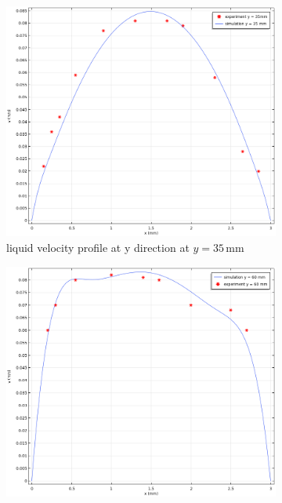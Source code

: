 \begin{figure}[H]
\centering
\begin{subfigure}{0.5\textwidth}
  \centering
  \includegraphics[width=1\linewidth]{squarechannelvalidation.png}
  \caption{liquid velocity profile at y direction at $ y = 35 \, \mathrm{mm} $}
  \label{triangular}
\end{subfigure}%
\begin{subfigure}{0.5\textwidth}
  \centering
  \includegraphics[width=1\linewidth]{squarechannelvalidation1.png}

\end{subfigure}
\end{figure}
